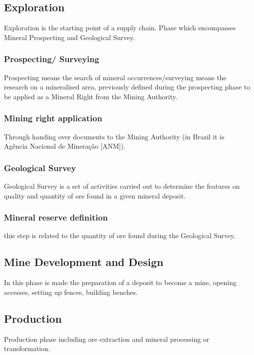 \subsection{Exploration}\label{sec:Exploration}
Exploration is the starting point of a supply chain. Phase which encompasses Mineral Prospecting and Geological Survey.

\subsubsection{Prospecting/ Surveying}\label{sec:Prospecting}
Prospecting means the search of mineral occurrences/surveying means the research on a mineralised area, previously defined during the prospecting phase to be applied as a Mineral Right from the Mining Authority.

\subsubsection{Mining right application}\label{sec:Mining}
Through handing over documents to the Mining Authority (in Brazil it is Agência Nacional de Mineração [ANM]).

\subsubsection{Geological Survey}\label{sec:GeologicalSurvey}
Geological Survey is a set of activities carried out to determine the features on quality and quantity of ore found in a given mineral deposit.

\subsubsection{Mineral reserve definition}\label{sec:MineralReserve}
this step is related to the quantity of ore found during the Geological Survey.

\subsection{Mine Development and Design}\label{sec:MineDevelopment}
In this phase is made the preparation of a deposit to become a mine, opening accesses, setting up fences, building benches.

\subsection{Production}\label{sec:Production}
Production phase including ore extraction and mineral processing or transformation.

